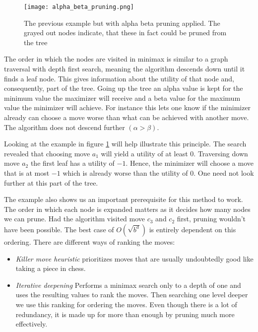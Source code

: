 \begin{figure}
    \centering
    \texttt{[image: alpha\_beta\_pruning.png]}
    \caption{The previous example but with alpha beta pruning applied. The grayed out nodes indicate, that these in fact could be pruned from the tree}
    \label{alpha_beta_pruning}
\end{figure}

The order in which the nodes are visited in minimax is similar to a graph traversal with depth first search, meaning the algorithm descends down until it finds a leaf node. This gives information about the utility of that node and, consequently, part of the tree. Going up the tree an alpha value is kept for the minimum value the maximizer will receive and a beta value for the maximum value the minimizer will achieve. For instance this lets one know if the minimizer already can choose a move worse than what can be achieved with another move. The algorithm does not descend further $ (\alpha > \beta) $.

Looking at the example in figure \ref{alpha_beta_pruning} will help illustrate this principle. The search revealed that choosing move $ a_1 $ will yield a utility of at least $0$. Traversing down move $ a_2 $ the first leaf has a utility of $-1$. Hence, the minimizer will choose a move that is at most $-1$ which is already worse than the utility of $0$. One need not look further at this part of the tree.

The example also shows us an important prerequisite for this method to work. The order in which each node is expanded matters as it decides how many nodes we can prune. Had the algorithm visited move $ c_3 $ and $ c_2 $ first, pruning wouldn't have been possible. The best case of $ O(\sqrt{b^d}) $ is entirely dependent on this ordering. There are different ways of ranking the moves:

\begin{itemize}
    \item \textit{Killer move heuristic} prioritizes moves that are usually undoubtedly good like taking a piece in chess.
    \item \textit{Iterative deepening} Performs a minimax search only to a depth of one and uses the resulting values to rank the moves. Then searching one level deeper we use this ranking for ordering the moves. Even though there is a lot of redundancy, it is made up for more than enough by pruning much more effectively.
\end{itemize}

